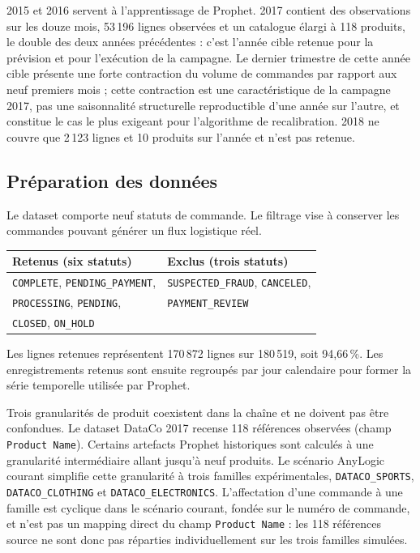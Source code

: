 \documentclass[11pt,a4paper]{article}
\newcommand{\code}[1]{\texttt{#1}}
\begin{document}
2015 et 2016 servent à l'apprentissage de Prophet. 2017 contient des observations sur les douze mois, 53\,196 lignes observées et un catalogue élargi à 118 produits, le double des deux années précédentes : c'est l'année cible retenue pour la prévision et pour l'exécution de la campagne. Le dernier trimestre de cette année cible présente une forte contraction du volume de commandes par rapport aux neuf premiers mois ; cette contraction est une caractéristique de la campagne 2017, pas une saisonnalité structurelle reproductible d'une année sur l'autre, et constitue le cas le plus exigeant pour l'algorithme de recalibration. 2018 ne couvre que 2\,123 lignes et 10 produits sur l'année et n'est pas retenue.

\subsection{Préparation des données}

Le dataset comporte neuf statuts de commande. Le filtrage vise à conserver les commandes pouvant générer un flux logistique réel.

\begin{center}
\small
\begin{tabular}{ll}
\toprule
Retenus (six statuts) & Exclus (trois statuts) \\
\midrule
\code{COMPLETE}, \code{PENDING\_PAYMENT}, & \code{SUSPECTED\_FRAUD}, \code{CANCELED}, \\
\code{PROCESSING}, \code{PENDING}, & \code{PAYMENT\_REVIEW} \\
\code{CLOSED}, \code{ON\_HOLD} & \\
\bottomrule
\end{tabular}
\end{center}

Les lignes retenues représentent 170\,872 lignes sur 180\,519, soit 94,66\,\%. Les enregistrements retenus sont ensuite regroupés par jour calendaire pour former la série temporelle utilisée par Prophet.

Trois granularités de produit coexistent dans la chaîne et ne doivent pas être confondues. Le dataset DataCo 2017 recense 118 références observées (champ \code{Product Name}). Certains artefacts Prophet historiques sont calculés à une granularité intermédiaire allant jusqu'à neuf produits. Le scénario AnyLogic courant simplifie cette granularité à trois familles expérimentales, \code{DATACO\_SPORTS}, \code{DATACO\_CLOTHING} et \code{DATACO\_ELECTRONICS}. L'affectation d'une commande à une famille est cyclique dans le scénario courant, fondée sur le numéro de commande, et n'est pas un mapping direct du champ \code{Product Name} : les 118 références source ne sont donc pas réparties individuellement sur les trois familles simulées.
\end{document}
